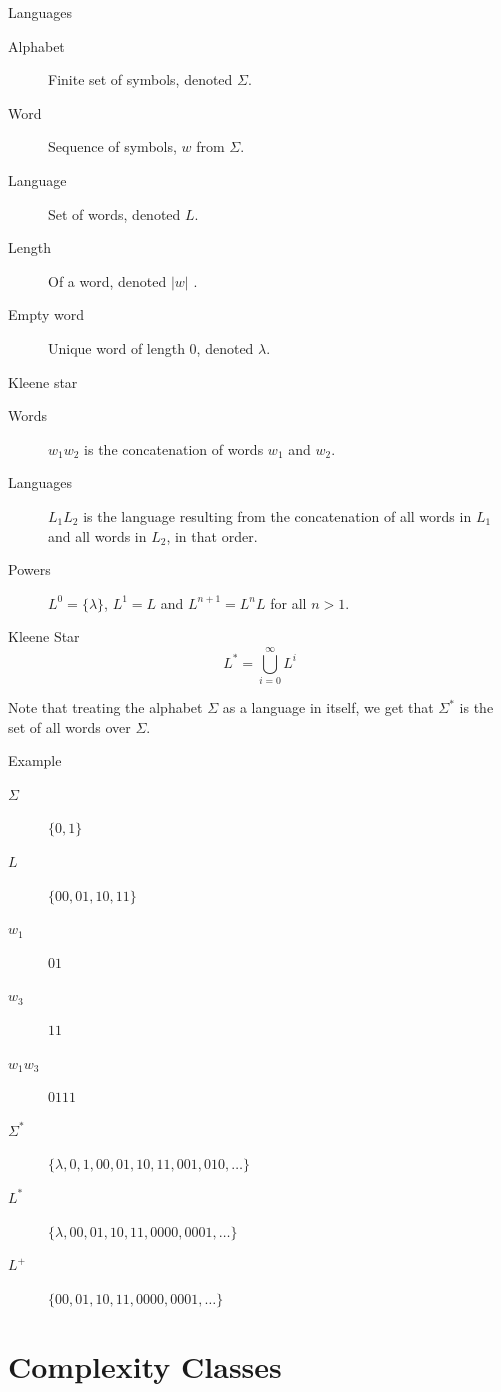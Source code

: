 \begin{frame}{Languages}
  \begin{description}
    \item[Alphabet] Finite set of symbols, denoted $\Sigma$.
    \item[Word] Sequence of symbols, $w$ from $\Sigma$.
    \item[Language] Set of words, denoted $L$.
    \item[Length] Of a word, denoted $|w|$	.
    \item[Empty word] Unique word of length 0, denoted $\lambda$.
  \end{description}
\end{frame}

\begin{frame}{Kleene star}
  \begin{description}
    \item[Words] $w_1 w_2$ is the concatenation of words $w_1$ and $w_2$.
    \item[Languages] $L_1 L_2$ is the language resulting from the concatenation of all words in $L_1$ and all words in $L_2$, in that order.
    \item[Powers] $L^0 = \{ \lambda \}$, $L^1 = L$ and $L^{n+1} = L^n L$ for all $n > 1$.
  \end{description}
  
  \vspace{0.5cm}
  
  \begin{block}{Kleene Star}
     \[ L^* =  \bigcup_{i=0}^{\infty} L^i \]
  \end{block}
  
  Note that treating the alphabet $\Sigma$ as a language in itself, we get that $\Sigma^*$ is the set of all words over $\Sigma$.
\end{frame}

\begin{frame}{Example}
  \begin{description}
    \item[$\Sigma$] $\{ 0, 1 \}$
    \item[$L$] $\{ 00, 01, 10, 11 \}$
    \item[$w_1$] $01$
    \item[$w_3$] $11$
    \item[$w_1 w_3$] $0111$
    \item[$\Sigma^*$] $\{ \lambda, 0, 1, 00, 01, 10, 11, 001, 010, \ldots \}$
    \item[$L^*$] $\{ \lambda, 00, 01, 10, 11, 0000, 0001, \ldots \}$
    \item[$L^+$] $\{ 00, 01, 10, 11, 0000, 0001, \ldots \}$
  \end{description}
\end{frame}

\section{Complexity Classes}
